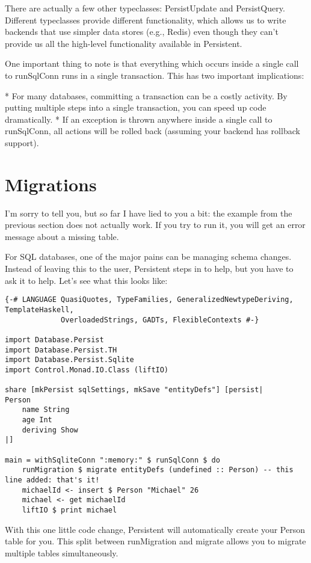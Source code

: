 There are actually a few other typeclasses: PersistUpdate and PersistQuery. Different typeclasses provide different functionality, which allows us to write backends that use simpler data stores (e.g., Redis) even though they can't provide us all the high-level functionality available in Persistent.

One important thing to note is that everything which occurs inside a single call to runSqlConn runs in a single transaction. This has two important implications:

* For many databases, committing a transaction can be a costly activity. By putting multiple steps into a single transaction, you can speed up code dramatically.
* If an exception is thrown anywhere inside a single call to runSqlConn, all actions will be rolled back (assuming your backend has rollback support).

\section{Migrations}

I'm sorry to tell you, but so far I have lied to you a bit: the example from the previous section does not actually work. If you try to run it, you will get an error message about a missing table.

For SQL databases, one of the major pains can be managing schema changes. Instead of leaving this to the user, Persistent steps in to help, but you have to ask it to help. Let's see what this looks like:

\begin{lstlisting}
{-# LANGUAGE QuasiQuotes, TypeFamilies, GeneralizedNewtypeDeriving, TemplateHaskell,
             OverloadedStrings, GADTs, FlexibleContexts #-}

import Database.Persist
import Database.Persist.TH
import Database.Persist.Sqlite
import Control.Monad.IO.Class (liftIO)

share [mkPersist sqlSettings, mkSave "entityDefs"] [persist|
Person
    name String
    age Int
    deriving Show
|]

main = withSqliteConn ":memory:" $ runSqlConn $ do
    runMigration $ migrate entityDefs (undefined :: Person) -- this line added: that's it!
    michaelId <- insert $ Person "Michael" 26
    michael <- get michaelId
    liftIO $ print michael
\end{lstlisting}%

With this one little code change, Persistent will automatically create your Person table for you. This split between runMigration and migrate allows you to migrate multiple tables simultaneously.

